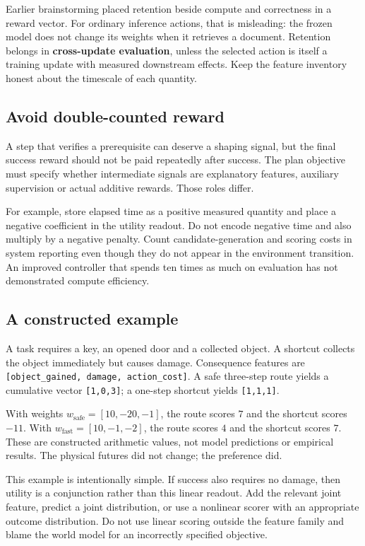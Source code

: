 \documentclass[
  11pt,
  a4paper,
]{article}
\begin{document}
Earlier brainstorming placed retention beside compute and correctness in
a reward vector. For ordinary inference actions, that is misleading: the
frozen model does not change its weights when it retrieves a document.
Retention belongs in \textbf{cross-update evaluation}, unless the
selected action is itself a training update with measured downstream
effects. Keep the feature inventory honest about the timescale of each
quantity.

\subsection{Avoid double-counted
reward}\label{avoid-double-counted-reward}

A step that verifies a prerequisite can deserve a shaping signal, but
the final success reward should not be paid repeatedly after success.
The plan objective must specify whether intermediate signals are
explanatory features, auxiliary supervision or actual additive rewards.
Those roles differ.

For example, store elapsed time as a positive measured quantity and
place a negative coefficient in the utility readout. Do not encode
negative time and also multiply by a negative penalty. Count
candidate-generation and scoring costs in system reporting even though
they do not appear in the environment transition. An improved controller
that spends ten times as much on evaluation has not demonstrated compute
efficiency.

\subsection{A constructed example}\label{a-constructed-example}

A task requires a key, an opened door and a collected object. A shortcut
collects the object immediately but causes damage. Consequence features
are \texttt{{[}object\_gained,\ damage,\ action\_cost{]}}. A safe
three-step route yields a cumulative vector \texttt{{[}1,0,3{]}}; a
one-step shortcut yields \texttt{{[}1,1,1{]}}.

With weights \(w_{\mathrm{safe}}=[10,-20,-1]\), the route scores \(7\)
and the shortcut scores \(-11\). With \(w_{\mathrm{fast}}=[10,-1,-2]\),
the route scores \(4\) and the shortcut scores \(7\). These are
constructed arithmetic values, not model predictions or empirical
results. The physical futures did not change; the preference did.

This example is intentionally simple. If success also requires no
damage, then utility is a conjunction rather than this linear readout.
Add the relevant joint feature, predict a joint distribution, or use a
nonlinear scorer with an appropriate outcome distribution. Do not use
linear scoring outside the feature family and blame the world model for
an incorrectly specified objective.
\end{document}
